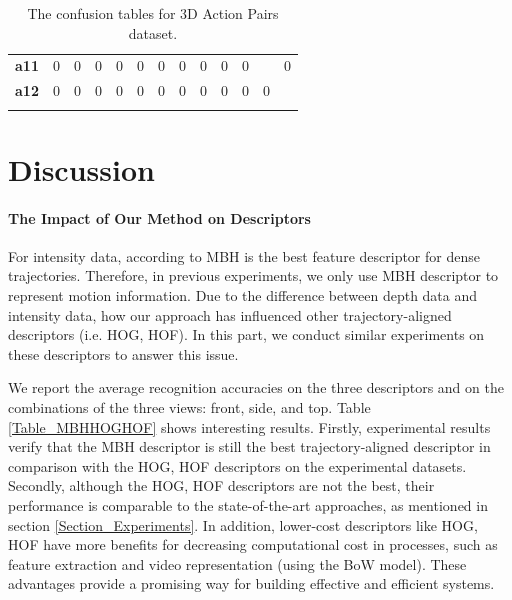 \documentclass[final,3p,times,twocolumn]{elsarticle}
\begin{document}
\begin{table}[h]
{{\begin{tabular}{c|c|c|c|c|c|c|c|c|c|c|c|c|}
				\hhline{~------------}
			 {\bf a11} &          0 &          0 &          0 &          0 &          0 &          0 &          0 &          0 &          0 &          0 &       \color{white}{\bf 1.0}\cellcolor[gray]{.0}  &          0 \\
				\hhline{~------------}
			 {\bf a12} &          0 &          0 &          0 &          0 &          0 &          0 &          0 &          0 &          0 &          0 &          0 &       \color{white}{\bf 1.0}\cellcolor[gray]{.0}  \\
				\hhline{~------------}
			\end{tabular} 
		}
		}
	\caption{The confusion tables for 3D Action Pairs dataset.}
	\label{Table_ConfusionMatrices_3DActionPairs}
\end{table}

\section{Discussion}
\label{Section_Discussion}

\paragraph{The Impact of Our Method on Descriptors}

For intensity data, according to \cite{wang2011densetraj} MBH is the best feature descriptor for dense trajectories. Therefore, in previous experiments, we only use MBH descriptor to represent motion information. Due to the difference between depth data and intensity data, how our approach has influenced other trajectory-aligned descriptors (i.e. HOG, HOF). In this part, we conduct similar experiments on these descriptors to answer this issue.

We report the average recognition accuracies on the three descriptors and on the combinations of the three views: front, side, and top. Table \ref{Table_MBHHOGHOF} shows interesting results.
Firstly, experimental results verify that the MBH descriptor is still the best trajectory-aligned descriptor in comparison with the HOG, HOF descriptors on the experimental datasets.
Secondly, although the HOG, HOF descriptors are not the best, their performance is comparable to the state-of-the-art approaches, as mentioned in section \ref{Section_Experiments}.
In addition, lower-cost descriptors like HOG, HOF have more benefits for decreasing computational cost in processes, such as feature extraction and video representation (using the BoW model).
These advantages provide a promising way for building effective and efficient systems.
\end{document}
